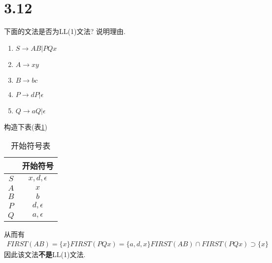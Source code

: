\documentclass[UTF8]{article}
\begin{document}
\section*{3.12}
\noindent 下面的文法是否为LL(1)文法? 说明理由.
\begin{enumerate}[]
\item $S \rightarrow AB|PQx$
\item $A \rightarrow xy$
\item $B \rightarrow bc$
\item $P \rightarrow dP|\epsilon$
\item $Q \rightarrow aQ|\epsilon$
\end{enumerate}

\noindent 构造下表(表\ref{3.12.start})\\
\begin{table}[H]
\centering
\begin{tabular}{|c|c|}
\hline
 & 开始符号 \\
\hline
$S$ & $x,d,\epsilon$ \\
\hline
$A$ & $x$ \\
\hline
$B$ & $b$ \\
\hline
$P$ & $d,\epsilon$ \\
\hline
$Q$ & $a,\epsilon$ \\
\hline
\end{tabular}
\caption{开始符号表}
\label{3.12.start}
\end{table}
\noindent 从而有
$$\begin{array}{l}
FIRST(AB)=\{x\}
FIRST(PQx)=\{a,d,x\}
FIRST(AB)\cap FIRST(PQx)\supset\{x\}
\end{array}$$
因此该文法\textbf{不是}LL(1)文法.
\end{document}
